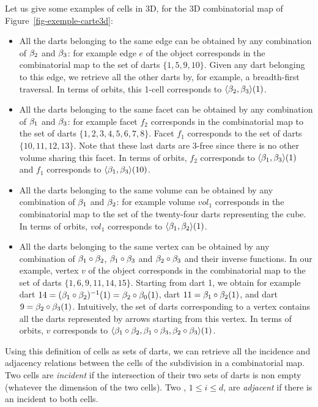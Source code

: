 Let us give some examples of cells in 3D, for the 3D combinatorial map
of Figure~\ref{fig-exemple-carte3d}:
\begin{itemize}
\item All the darts belonging to the same edge can be obtained by any
  combination of $\beta_{2}$ and $\beta_{3}$: for example edge $e$ of the
  object corresponds in the combinatorial map to the set of darts
  $\{1,5,9,10\}$. Given any dart belonging to this edge, we retrieve
  all the other darts by, for example, a breadth-first traversal. In terms
  of orbits, this 1-cell corresponds to $\langle{}\beta_2,\beta_3\rangle{}(1)$.

\item All the darts belonging to the same facet can be obtained by any
  combination of $\beta_{1}$ and $\beta_{3}$: for example facet $f_2$
  corresponds in the combinatorial map to the set of darts
  $\{1,2,3,4,5,6,7,8\}$. Facet $f_1$ corresponds to the set of darts
  $\{10,11,12,13\}$. Note that these last darts are $3$-free since
  there is no other volume sharing this facet.  In terms of orbits,
  $f_2$ corresponds to $\langle{}\beta_1,\beta_3\rangle{}(1)$ and $f_1$
  corresponds to $\langle{}\beta_1,\beta_3\rangle{}(10)$.

\item All the darts belonging to the same volume can be obtained by
  any combination of $\beta_{1}$ and $\beta_{2}$: for example volume $vol_1$
  corresponds in the combinatorial map to the set of the twenty-four
  darts representing the cube. In terms of orbits, $vol_1$ corresponds
  to $\langle{}\beta_1,\beta_2\rangle{}(1)$.

\item All the darts belonging to the same vertex can be obtained by
  any combination of $\beta_{1}\circ\beta_{2}$,
  $\beta_{1}\circ\beta_{3}$ and $\beta_{2}\circ\beta_{3}$ and their inverse
  functions.  In our example, vertex $v$ of the object corresponds
  in the combinatorial map to the set of darts $\{1,6,9,11,14,15\}$.
  Starting from dart 1, we obtain for example dart
  $14=(\beta_{1}\circ\beta_{2})^{-1}(1)=\beta_{2}\circ\beta_{0}(1)$, dart
  $11=\beta_{1}\circ\beta_{2}(1)$, and dart $9=\beta_{2}\circ\beta_{3}(1)$.
  Intuitively, the set of darts corresponding to a vertex contains all
  the darts represented by arrows starting from this vertex.  In terms
  of orbits, $v$ corresponds to $\langle{}\beta_1 \circ \beta_2,
    \beta_1 \circ \beta_3, \beta_2 \circ \beta_3\rangle{}(1)$.
\end{itemize}

Using this definition of cells as sets of darts, we can retrieve all the
incidence and adjacency relations between the cells of the subdivision
in a combinatorial map.  Two cells are \emph{incident} if the
intersection of their two sets of darts is non empty (whatever the
dimension of the two cells). Two , $1\leq i \leq d$, are
\emph{adjacent} if there is an  incident to both cells.

